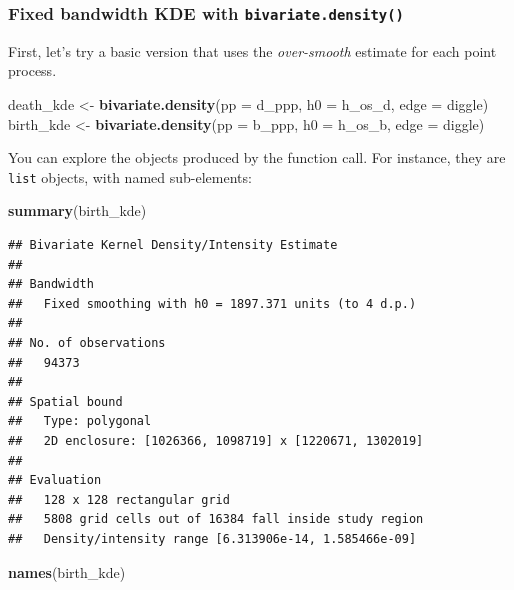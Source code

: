 \documentclass[
]{book}
\newenvironment{Shaded}{\begin{snugshade}}{\end{snugshade}}
\newcommand{\AttributeTok}[1]{\textcolor[rgb]{0.13,0.29,0.53}{#1}}
\newcommand{\FunctionTok}[1]{\textcolor[rgb]{0.13,0.29,0.53}{\textbf{#1}}}
\newcommand{\NormalTok}[1]{#1}
\newcommand{\OtherTok}[1]{\textcolor[rgb]{0.56,0.35,0.01}{#1}}
\newcommand{\StringTok}[1]{\textcolor[rgb]{0.31,0.60,0.02}{#1}}
\begin{document}
\hypertarget{fixed-bandwidth-kde-with-bivariate.density}{%
\subsubsection{\texorpdfstring{Fixed bandwidth KDE with \texttt{bivariate.density()}}{Fixed bandwidth KDE with bivariate.density()}}\label{fixed-bandwidth-kde-with-bivariate.density}}

First, let's try a basic version that uses the \emph{over-smooth} estimate for each point process.

\begin{Shaded}
\begin{Highlighting}[]
\NormalTok{death\_kde }\OtherTok{\textless{}{-}} \FunctionTok{bivariate.density}\NormalTok{(}\AttributeTok{pp =}\NormalTok{ d\_ppp, }\AttributeTok{h0 =}\NormalTok{ h\_os\_d, }\AttributeTok{edge =} \StringTok{\textquotesingle{}diggle\textquotesingle{}}\NormalTok{)}
\NormalTok{birth\_kde }\OtherTok{\textless{}{-}} \FunctionTok{bivariate.density}\NormalTok{(}\AttributeTok{pp =}\NormalTok{ b\_ppp, }\AttributeTok{h0 =}\NormalTok{ h\_os\_b, }\AttributeTok{edge =} \StringTok{\textquotesingle{}diggle\textquotesingle{}}\NormalTok{)}
\end{Highlighting}
\end{Shaded}

You can explore the objects produced by the function call. For instance, they are \texttt{list} objects, with named sub-elements:

\begin{Shaded}
\begin{Highlighting}[]
\FunctionTok{summary}\NormalTok{(birth\_kde)}
\end{Highlighting}
\end{Shaded}

\begin{verbatim}
## Bivariate Kernel Density/Intensity Estimate
## 
## Bandwidth
##   Fixed smoothing with h0 = 1897.371 units (to 4 d.p.)
## 
## No. of observations
##   94373 
## 
## Spatial bound
##   Type: polygonal
##   2D enclosure: [1026366, 1098719] x [1220671, 1302019]
## 
## Evaluation
##   128 x 128 rectangular grid
##   5808 grid cells out of 16384 fall inside study region
##   Density/intensity range [6.313906e-14, 1.585466e-09]
\end{verbatim}

\begin{Shaded}
\begin{Highlighting}[]
\FunctionTok{names}\NormalTok{(birth\_kde)}
\end{Highlighting}
\end{Shaded}
\end{document}
